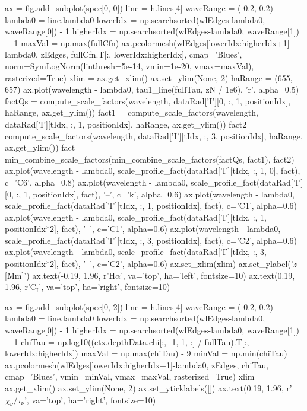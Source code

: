 \begin{pycode}[2DRT]
    ax = fig.add_subplot(spec[0, 0])
    line = h.lines[4]
    waveRange = (-0.2, 0.2)
    lambda0 = line.lambda0
    lowerIdx = np.searchsorted(wlEdges-lambda0, waveRange[0]) - 1
    higherIdx = np.searchsorted(wlEdges-lambda0, waveRange[1]) + 1
    maxVal = np.max(fullCfn)
    ax.pcolormesh(wlEdges[lowerIdx:higherIdx+1]-lambda0, zEdges, fullCfn.T[:, lowerIdx:higherIdx],
                  cmap='Blues', norm=SymLogNorm(linthresh=5e-14, vmin=1e-20, vmax=maxVal), rasterized=True)
    xlim = ax.get_xlim()
    ax.set_ylim(None, 2)
    haRange = (655, 657)
    ax.plot(wavelength - lambda0, tau1_line(fullTau, zN / 1e6), 'r', alpha=0.5)
    factQs = compute_scale_factors(wavelength, dataRad['I'][0, :, 1, positionIdx],
                                   haRange, ax.get_ylim())
    fact1 = compute_scale_factors(wavelength, dataRad['I'][tIdx, :, 1, positionIdx],
                                   haRange, ax.get_ylim())
    fact2 = compute_scale_factors(wavelength, dataRad['I'][tIdx, :, 3, positionIdx],
                                   haRange, ax.get_ylim())
    fact = min_combine_scale_factors(min_combine_scale_factors(factQs, fact1), fact2)
    ax.plot(wavelength - lambda0,
            scale_profile_fact(dataRad['I'][tIdx, :, 1, 0], fact),  c='C6', alpha=0.8)
    ax.plot(wavelength - lambda0,
            scale_profile_fact(dataRad['I'][0, :, 1, positionIdx], fact), '--', c='k', alpha=0.6)
    ax.plot(wavelength - lambda0,
            scale_profile_fact(dataRad['I'][tIdx, :, 1, positionIdx], fact), c='C1', alpha=0.6)
    ax.plot(wavelength - lambda0,
            scale_profile_fact(dataRad['I'][tIdx, :, 1, positionIdx*2], fact), '--', c='C1', alpha=0.6)
    ax.plot(wavelength - lambda0,
            scale_profile_fact(dataRad['I'][tIdx, :, 3, positionIdx], fact), c='C2', alpha=0.6)
    ax.plot(wavelength - lambda0,
            scale_profile_fact(dataRad['I'][tIdx, :, 3, positionIdx*2], fact), '--', c='C2', alpha=0.6)
    ax.set_xlim(xlim)
    ax.set_ylabel('$z$ [Mm]')
    ax.text(-0.19, 1.96, r'H$\alpha$', va='top', ha='left', fontsize=10)
    ax.text(0.19, 1.96, r'C$_\mathrm{I}$', va='top', ha='right', fontsize=10)

    ax = fig.add_subplot(spec[0, 2])
    line = h.lines[4]
    waveRange = (-0.2, 0.2)
    lambda0 = line.lambda0
    lowerIdx = np.searchsorted(wlEdges-lambda0, waveRange[0]) - 1
    higherIdx = np.searchsorted(wlEdges-lambda0, waveRange[1]) + 1
    chiTau = np.log10((ctx.depthData.chi[:, -1, 1, :] / fullTau).T[:, lowerIdx:higherIdx])
    maxVal = np.max(chiTau) - 9
    minVal = np.min(chiTau)
    ax.pcolormesh(wlEdges[lowerIdx:higherIdx+1]-lambda0, zEdges,
                  chiTau,
                  cmap='Blues', vmin=minVal, vmax=maxVal, rasterized=True)
    xlim = ax.get_xlim()
    ax.set_ylim(None, 2)
    ax.set_yticklabels([])
    ax.text(0.19, 1.96, r'$\chi_\nu / \tau_\nu$', va='top', ha='right', fontsize=10)


\end{pycode}
